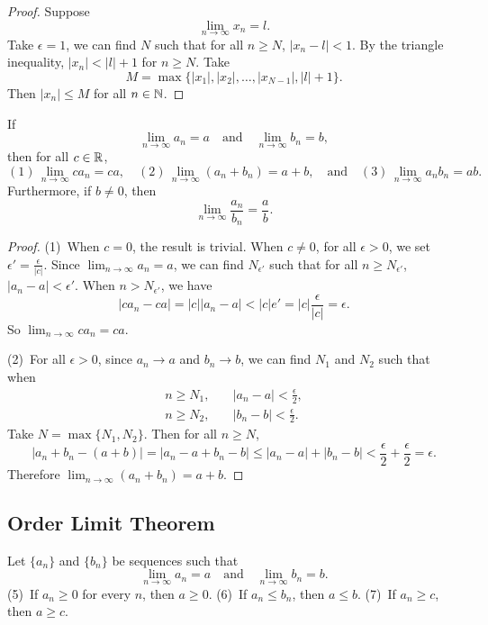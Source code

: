 \begin{proof}
  Suppose
  \[
    \lim_{n \to \infty} x_n = l
  .\]
  Take $\epsilon = 1$, we can find $N$ such that for all
  $n \ge N$, $|x_n - l| < 1$. By the triangle inequality,
  $|x_n| < |l| + 1$ for $n \ge N$. Take
  \[M = \max\{|x_1|, |x_2|, \dots, |x_{N - 1}|, |l| + 1\}.\]
  Then $|x_n| \le M$ for all $n \in \mathbb{N}$.
\end{proof}

\begin{theorem}
  If
  \[
    \lim_{n \to \infty} a_n = a \quad \text{and} \quad
    \lim_{n \to \infty} b_n = b
  ,\]
  then for all $c \in \mathbb{R}$,
  \[
    (1)\, \lim_{n \to \infty} ca_n = ca, \quad
    (2)\, \lim_{n \to \infty} (a_n + b_n) = a + b, \quad \text{and} \quad
    (3)\, \lim_{n \to \infty} a_nb_n = ab
  .\]
  Furthermore, if $b \ne 0$, then
  \[
    \lim_{n \to \infty} \frac{a_n}{b_n} = \frac{a}{b} \tag{4}
  .\]
\end{theorem}

\begin{proof}
  (1)\, When $c = 0$, the result is trivial. When $c \ne 0$, for
  all $\epsilon > 0$, we set
  $\epsilon' = \frac{\epsilon}{|c|}$.
  Since $\lim_{n \to \infty} a_n = a$, we can find
  $N_{\epsilon'}$ such that for all $n \ge N_{\epsilon'}$,
  $|a_n - a| < \epsilon'$.
  When $n > N_{\epsilon'}$, we have
  \[
  |ca_n - ca| = |c||a_n - a| < |c|e' = |c| \frac{\epsilon}{|c|} = \epsilon
  .\]
  So $\lim_{n \to \infty} ca_n = ca$.

  (2)\, For all $\epsilon > 0$, since $a_n \to a$ and $b_n \to b$,
  we can find $N_1$ and $N_2$ such that when
  \begin{align*}
    n \ge N_1, &\quad |a_n - a| < \frac{\epsilon}{2}, \\
    n \ge N_2, &\quad |b_n - b| < \frac{\epsilon}{2}.
  \end{align*}
  Take $N = \max\{N_1, N_2\}$. Then for all $n \ge N$,
   \[
  |a_n + b_n - (a + b)| = |a_n - a + b_n - b| \le
  |a_n - a| + |b_n - b| < \frac{\epsilon}{2} + \frac{\epsilon}{2}
  = \epsilon
  .\]
  Therefore $\lim_{n \to \infty} (a_n + b_n) = a + b$.
\end{proof}

\subsection{Order Limit Theorem}
\begin{theorem}
  Let $\{a_n\}$ and $\{b_n\}$ be sequences such that
  \[
    \lim_{n \to \infty} a_n = a \quad \text{and} \quad
    \lim_{n \to \infty} b_n = b
  .\]
  (5)\, If $a_n \ge 0$ for every $n$, then $a \ge 0$.
  (6)\, If $a_n \le b_n$, then $a \le b$.
  (7)\, If $a_n \ge c$, then $a \ge c$.
\end{theorem}

